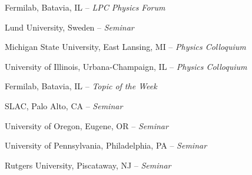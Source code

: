 \documentclass[11pt,letterpaper]{article}
\begin{document}
\begin{itemizetighter}
    \item Fermilab, Batavia, IL -- \emph{LPC Physics Forum} 


    \item Lund University, Sweden -- \emph{Seminar}  %
    \item Michigan State University, East Lansing, MI -- \emph{Physics Colloquium}  %
    \item University of Illinois, Urbana-Champaign, IL -- \emph{Physics Colloquium}  %
    \item Fermilab, Batavia, IL --  \emph{Topic of the Week}  %
    \item SLAC, Palo Alto, CA -- \emph{Seminar}  %
    \item University of Oregon, Eugene, OR -- \emph{Seminar}  %
    \item University of Pennsylvania, Philadelphia, PA -- \emph{Seminar}  %
    \item Rutgers University, Piscataway, NJ -- \emph{Seminar}  %




\end{itemizetighter}
\end{document}
